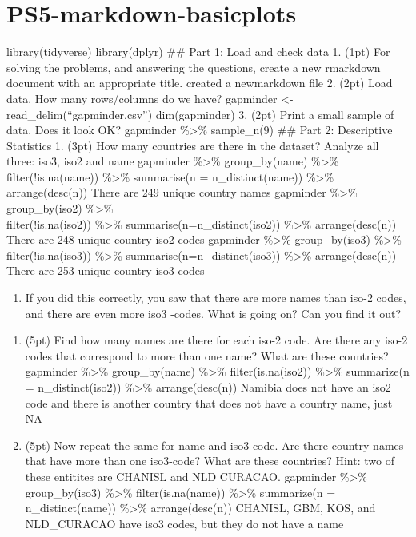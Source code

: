 \documentclass[]{article}
\author{}
\date{\vspace{-2.5em}}
\providecommand{\tightlist}{%
  \setlength{\itemsep}{0pt}\setlength{\parskip}{0pt}}
\begin{document}
\section{PS5-markdown-basicplots}\label{ps5-markdown-basicplots}

library(tidyverse) library(dplyr) \#\# Part 1: Load and check data 1.
(1pt) For solving the problems, and answering the questions, create a
new rmarkdown document with an appropriate title. created a newmarkdown
file 2. (2pt) Load data. How many rows/columns do we have? gapminder
\textless{}- read\_delim(``gapminder.csv'') dim(gapminder) 3. (2pt)
Print a small sample of data. Does it look OK? gapminder
\%\textgreater{}\% sample\_n(9) \#\# Part 2: Descriptive Statistics 1.
(3pt) How many countries are there in the dataset? Analyze all three:
iso3, iso2 and name gapminder \%\textgreater{}\% group\_by(name)
\%\textgreater{}\%\\
filter(!is.na(name)) \%\textgreater{}\% summarise(n = n\_distinct(name))
\%\textgreater{}\% arrange(desc(n)) There are 249 unique country names
gapminder \%\textgreater{}\% group\_by(iso2) \%\textgreater{}\%\\
filter(!is.na(iso2)) \%\textgreater{}\% summarise(n=n\_distinct(iso2))
\%\textgreater{}\% arrange(desc(n)) There are 248 unique country iso2
codes gapminder \%\textgreater{}\% group\_by(iso3) \%\textgreater{}\%\\
filter(!is.na(iso3)) \%\textgreater{}\% summarise(n=n\_distinct(iso3))
\%\textgreater{}\% arrange(desc(n)) There are 253 unique country iso3
codes

\begin{enumerate}
\def\labelenumi{\arabic{enumi}.}
\setcounter{enumi}{1}
\tightlist
\item
  If you did this correctly, you saw that there are more names than
  iso-2 codes, and there are even more iso3 -codes. What is going on?
  Can you find it out?
\end{enumerate}

\begin{enumerate}
\def\labelenumi{(\alph{enumi})}
\item
  (5pt) Find how many names are there for each iso-2 code. Are there any
  iso-2 codes that correspond to more than one name? What are these
  countries? gapminder \%\textgreater{}\% group\_by(name)
  \%\textgreater{}\% filter(is.na(iso2)) \%\textgreater{}\% summarize(n
  = n\_distinct(iso2)) \%\textgreater{}\% arrange(desc(n)) Namibia does
  not have an iso2 code and there is another country that does not have
  a country name, just NA
\item
  (5pt) Now repeat the same for name and iso3-code. Are there country
  names that have more than one iso3-code? What are these countries?
  Hint: two of these entitites are CHANISL and NLD CURACAO. gapminder
  \%\textgreater{}\% group\_by(iso3) \%\textgreater{}\%
  filter(is.na(name)) \%\textgreater{}\% summarize(n =
  n\_distinct(name)) \%\textgreater{}\% arrange(desc(n)) CHANISL, GBM,
  KOS, and NLD\_CURACAO have iso3 codes, but they do not have a name
\end{enumerate}
\end{document}
